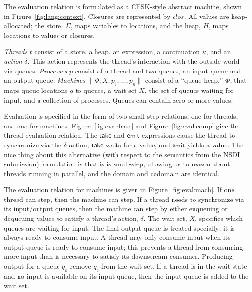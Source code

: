 \documentclass[twocolumn]{article}
\newcommand{\kw}[1]{\textsf{#1}}
\newcommand{\mach}[3]{\parallel\!#1; #2; #3\!\parallel}
\begin{document}
The evaluation relation is formulated as a CESK-style abstract machine, shown in
Figure~\ref{fig:lang:context}. Closures are represented by $clos$. All values
are heap-allocated; the store, $\Sigma$, maps variables to locations, and the
heap, $H$, maps locations to values or closures.

\emph{Threads} $t$ consist of a store, a heap, an expression, a continuation
$\kappa$, and an \emph{action} $\delta$. This action represents the thread's
interaction with the outside world via queues. \emph{Processes} $p$ consist of a
thread and two queues, an input queue and an output queue. \emph{Machines}
$\mach{\Phi}{X}{p_1,\ldots,p_n}$ consist of a ``queue heap,'' $\Phi$, that maps
queue locations $q$ to queues, a wait set $X$, the set of queues waiting for
input, and a collection of processes. Queues can contain zero or more values.

Evaluation is specified in the form of two small-step relations, one for
threads, and one for machines. Figure~\ref{fig:eval:base} and
Figure~\ref{fig:eval:comp} give the thread evaluation relation. The $\kw{take}$
and $\kw{emit}$ expressions cause the thread to synchronize via the $\delta$
action; $\kw{take}$ waits for a value, and $\kw{emit}$ yields a value. The nice
thing about this alternative (with respect to the semantics from the NSDI
submission) formulation is that is is small-step, allowing us to reason about
threads running in parallel, and the domain and codomain are identical.

The evaluation relation for machines is given in Figure~\ref{fig:eval:mach}. If
one thread can step, then the machine can step. If a thread needs to synchronize
via its input/output queues, then the machine can step by either enqueuing or
dequeuing values to satisfy a thread's action, $\delta$. The wait set, $X$,
specifies which queues are waiting for input. The final output queue is treated
specially; it is always ready to consume input. A thread may only consume input
when its output queue is ready to consume input; this prevents a thread from
consuming more input than is necessary to satisfy its downstream
consumer. Producing output for a queue $q_o$ remove $q_o$ from the wait set. If
a thread is in the \kw{wait} state and no input is available on its input queue,
then the input queue is added to the wait set.
\end{document}
